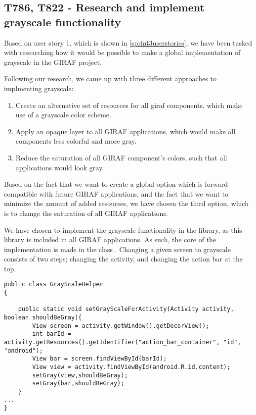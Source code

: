 

\subsection{T786, T822 - Research and implement grayscale functionality}
Based on user story 1, which is shown in \autoref{sprint3userstories}, we have
been tasked with researching how it would be possible to make a global implementation of
grayscale in the GIRAF project.\nl

Following our research, we came up with three different approaches to
implmenting grayscale:

\begin{enumerate}
  \item Create an alternative set of resources for all giraf components, which
  make use of a grayscale color scheme.
  \item Apply an opaque layer to all GIRAF applications, which would make all
  components less colorful and more gray.
  \item Reduce the saturation of all GIRAF component's colors, such that all
  applications would look gray.
\end{enumerate}

Based on the fact that we want to create a global option which is forward
compatible with future GIRAF applications, and the fact that we want
to minimize the amount of added resourses, we have chosen the third
option, which is to change the saturation of all GIRAF applications.\nl

We have chosen to implement the grayscale functionality in the
 library, as this library is included in all GIRAF
applications. As such, the core of the implementation is made in the class
. Changing a given screen to grayscale consists of two
steps; changing the activity, and changing the action bar at the top.\nl

\begin{minipage}[H]{\linewidth}
\begin{lstlisting}[caption = Code used to determine the views for the activity and the top action bar., label = grayEx1] 
public class GrayScaleHelper
{

    public static void setGrayScaleForActivity(Activity activity, boolean shouldBeGray){
        View screen = activity.getWindow().getDecorView();
        int barId = activity.getResources().getIdentifier("action_bar_container", "id", "android");
        View bar = screen.findViewById(barId);
        View view = activity.findViewById(android.R.id.content);
        setGray(view,shouldBeGray);
        setGray(bar,shouldBeGray);
    }
...
}
\end{lstlisting}
\end{minipage}

